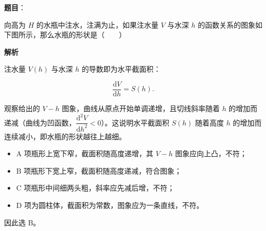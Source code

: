 \begin{answer}

\textbf{题目}：

向高为 $H$ 的水瓶中注水，注满为止，如果注水量 $V$ 与水深 $h$ 的函数关系的图象如下图所示，那么水瓶的形状是\mbox{（　　）}
\nopagebreak[4]
\begin{center}\end{center}
\nopagebreak[4]
\textbf{解析}

注水量 $V(h)$ 与水深 $h$ 的导数即为水平截面积：

\nopagebreak[4]
\[
\frac{\mathrm{d}V}{\mathrm{d}h} = S(h).
\]

观察给出的 $V-h$ 图象，曲线从原点开始单调递增，且切线斜率随着 $h$ 的增加而递减（曲线为凹函数，$\dfrac{\mathrm{d}^2V}{\mathrm{d}h^2}<0$）。这说明水平截面积 $S(h)$ 随着高度 $h$ 的增加而连续减小，即水瓶的形状越往上越细。

\begin{itemize}
\item A 项瓶形上宽下窄，截面积随高度递增，其 $V-h$ 图象应向上凸，不符；
\item B 项瓶形下宽上窄，截面积随高度递减，符合图象；
\item C 项瓶形中间细两头粗，斜率应先减后增，不符；
\item D 项为圆柱体，截面积为常数，图象应为一条直线，不符。
\end{itemize}

因此选 B。


\end{answer}
